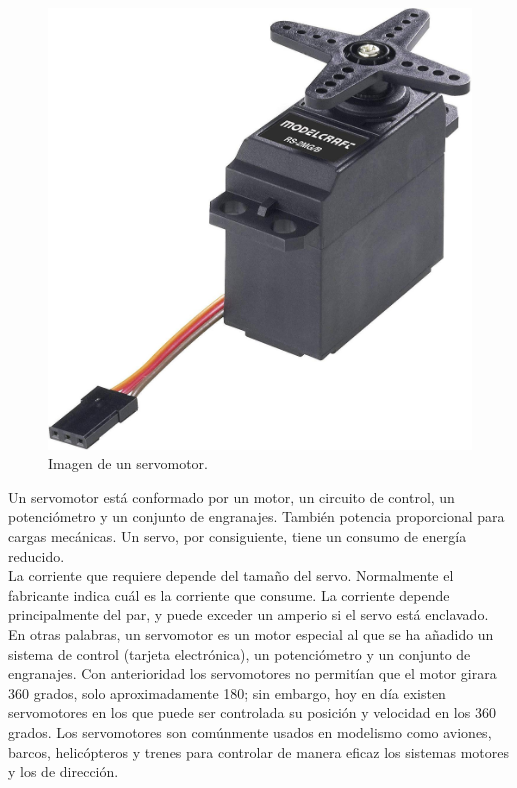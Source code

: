 \begin{figure}[H]
  \begin{center}
    \includegraphics[scale=0.1]{imagenes/servo.jpg}
  \end{center}
  \caption{Imagen de un servomotor.}
  \label{figure:servomotor:}
\end{figure}

Un servomotor está conformado por un motor, un circuito de control, un potenciómetro y un conjunto de engranajes. También potencia proporcional para cargas mecánicas. Un servo,
por consiguiente, tiene un consumo de energía reducido.\\

La corriente que requiere depende del tamaño del servo. Normalmente el fabricante indica cuál es la corriente que consume. La corriente depende principalmente del par, y puede
exceder un amperio si el servo está enclavado.\\

En otras palabras, un servomotor es un motor especial al que se ha añadido un sistema de control (tarjeta electrónica), un potenciómetro y un conjunto de engranajes. Con 
anterioridad los servomotores no permitían que el motor girara 360 grados, solo aproximadamente 180; sin embargo, hoy en día existen servomotores en los que puede ser controlada
su posición y velocidad en los 360 grados. Los servomotores son comúnmente usados en modelismo como aviones, barcos, helicópteros y trenes para controlar de manera eficaz los sistemas
motores y los de dirección.\\

